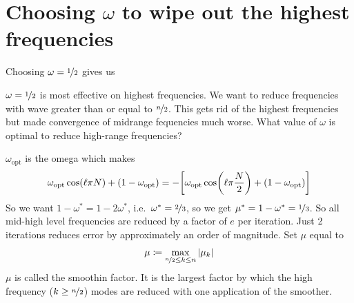 \documentclass{article}
\newcommand{\half}{\nicefrac{1}{2}}
\newcommand{\third}{\nicefrac{1}{3}}
\begin{document}
    \section{Choosing $\omega$ to wipe out the highest frequencies}
        Choosing $\omega = \half$ gives us
        \begin{figure}[ht!]
            \centering
        \end{figure}
        \FloatBarrier
        $\omega=\half$ is most effective on highest frequencies.  We want to reduce frequencies with wave greater than or equal to $\nicefrac{n}{2}$.  This gets rid of the highest frequencies but made convergence of midrange fequencies much worse.  What value of $\omega$ is optimal to reduce high-range frequencies?
        \begin{figure}[ht!]
            \centering
        \end{figure}
        \FloatBarrier
        $\omega_\text{opt}$ is the omega which makes
        \begin{align*}
            \omega_\text{opt}\cos(\ell\pi N) + (1 - \omega_\text{opt}) = -\qty[\omega_\text{opt}\cos(\ell\pi \frac{N}{2}) + (1 - \omega_\text{opt})]
        \end{align*}
        So we want $1 - \omega^* = 1 - 2\omega^*$, i.e.~$\omega^* = \nicefrac{2}{3}$, so we get $\mu^* = 1 - \omega^* = \third$.  So all mid-high level frequencies are reduced by a factor of $e$ per iteration.  Just 2 iterations reduces error by approximately an order of magnitude.  Set $\mu$ equal to
        \begin{align*}
            \mu \coloneqq \max_{\nicefrac{n}{2}\leq k \leq n}\abs{\mu_k}
        \end{align*}
        $\mu$ is called the smoothin factor.  It is the largest factor by which the high frequency ($k \geq \nicefrac{n}{2}$) modes are reduced with one application of the smoother.
\end{document}
